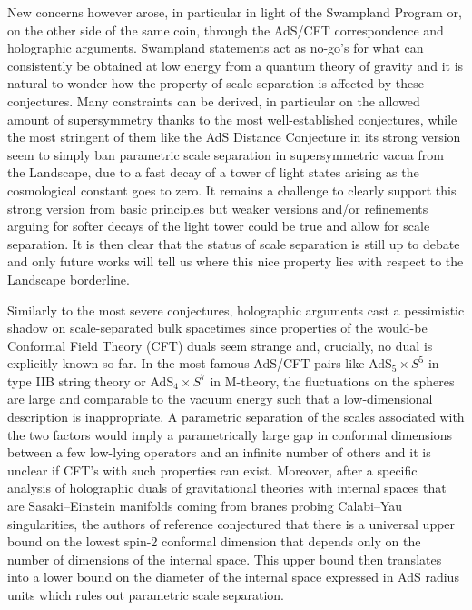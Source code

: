 \documentclass[11pt, a4paper]{article}
\begin{document}
New concerns however arose, in particular in light of the Swampland Program \cite{Vafa:2005ui,Brennan:2017rbf,Palti:2019pca,vanBeest:2021lhn,Grana:2021zvf} or, on the other side of the same coin, through the AdS/CFT correspondence \cite{Maldacena:1997re} and holographic arguments. Swampland statements act as no-go's for what can consistently be obtained at low energy from a quantum theory of gravity and it is natural to wonder how the property of scale separation is affected by these conjectures. Many constraints can be derived, in particular on the allowed amount of supersymmetry \cite{Cribiori:2022trc,Cribiori:2023ihv,Montero:2022ghl} thanks to the most well-established conjectures, while the most stringent of them like the AdS Distance Conjecture \cite{Lust:2019zwm} in its strong version seem to simply ban parametric scale separation in supersymmetric vacua from the Landscape, due to a fast decay of a tower of light states arising as the cosmological constant goes to zero. It remains a challenge to clearly support this strong version from basic principles but weaker versions and/or refinements \cite{Lust:2019zwm,Buratti:2020kda} arguing for softer decays of the light tower could be true and allow for scale separation. It is then clear that the status of scale separation is still up to debate and only future works will tell us where this nice property lies with respect to the Landscape borderline.

Similarly to the most severe conjectures, holographic arguments \cite{Heemskerk:2009pn,Polchinski:2009ch,deAlwis:2014wia,Conlon:2018vov,Conlon:2020wmc} cast a pessimistic shadow on scale-separated bulk spacetimes since properties of the would-be Conformal Field Theory (CFT) duals seem strange and, crucially, no dual is explicitly known so far. In the most famous AdS/CFT pairs like AdS$_5\times S^5$ in type IIB string theory or AdS$_4\times S^7$ in M-theory, the fluctuations on the spheres are large and comparable to the vacuum energy such that a low-dimensional description is inappropriate. A parametric separation of the scales associated with the two factors would imply a parametrically large gap in conformal dimensions between a few low-lying operators and an infinite number of others \cite{Polchinski:2009ch,deAlwis:2014wia,Conlon:2018vov,Conlon:2020wmc} and it is unclear if CFT's with such properties can exist. Moreover, after a specific analysis of holographic duals of gravitational theories with internal spaces that are Sasaki--Einstein manifolds coming from branes probing Calabi--Yau singularities, the authors of reference \cite{Collins:2022nux} conjectured that there is a universal upper bound on the lowest spin-2 conformal dimension that depends only on the number of dimensions of the internal space. This upper bound then translates into a lower bound on the diameter of the internal space expressed in AdS radius units which rules out parametric scale separation.
\end{document}
